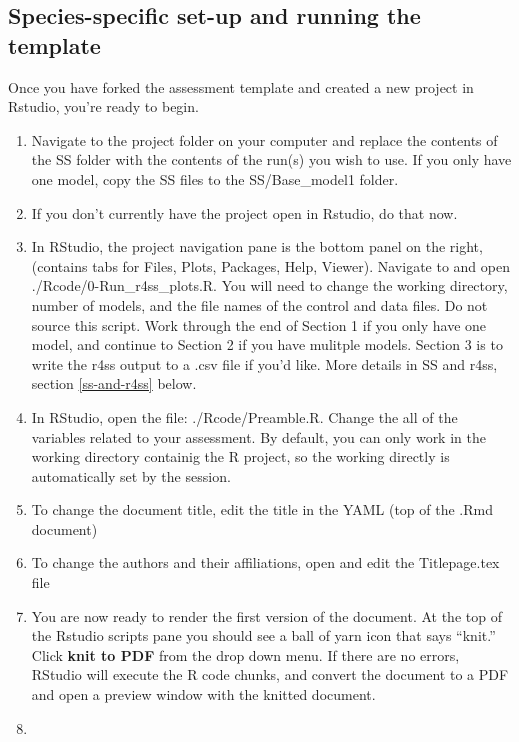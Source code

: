 \documentclass[12pt,]{article}
\begin{document}
\subsection{Species-specific set-up and running the
template}\label{species-specific-set-up-and-running-the-template}

Once you have forked the assessment template and created a new project
in Rstudio, you're ready to begin.

\begin{enumerate}
\def\labelenumi{\arabic{enumi}.}
\item
  Navigate to the project folder on your computer and replace the
  contents of the SS folder with the contents of the run(s) you wish to
  use. If you only have one model, copy the SS files to the
  SS/Base\_model1 folder.
\item
  If you don't currently have the project open in Rstudio, do that now.
\item
  In RStudio, the project navigation pane is the bottom panel on the
  right, (contains tabs for Files, Plots, Packages, Help, Viewer).
  Navigate to and open ./Rcode/0-Run\_r4ss\_plots.R. You will need to
  change the working directory, number of models, and the file names of
  the control and data files. Do not source this script. Work through
  the end of Section 1 if you only have one model, and continue to
  Section 2 if you have mulitple models. Section 3 is to write the r4ss
  output to a .csv file if you'd like. More details in SS and r4ss,
  section \ref{ss-and-r4ss} below.
\item
  In RStudio, open the file: ./Rcode/Preamble.R. Change the all of the
  variables related to your assessment. By default, you can only work in
  the working directory containig the R project, so the working directly
  is automatically set by the session.
\item
  To change the document title, edit the title in the YAML (top of the
  .Rmd document)
\item
  To change the authors and their affiliations, open and edit the
  Titlepage.tex file
\item
  You are now ready to render the first version of the document. At the
  top of the Rstudio scripts pane you should see a ball of yarn icon
  that says ``knit.'' Click \textbf{knit to PDF} from the drop down
  menu. If there are no errors, RStudio will execute the R code chunks,
  and convert the document to a PDF and open a preview window with the
  knitted document.
\item

\end{enumerate}
\end{document}
